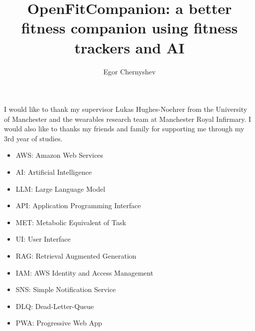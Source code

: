 \documentclass[12pt,BSc,wordcount]{muthesis}
\begin{document}

\title{OpenFitCompanion: a better fitness companion using fitness trackers and AI}
\author{Egor Chernyshev}

\beforeabstract



\afterabstract

I would like to thank my supervisor Lukas Hughes-Noehrer from the University of Manchester and the 
wearables research team at Manchester Royal Infirmary. I would also like to thanks my friends and family
for supporting me through my 3rd year of studies. 

\afterpreface

\begin{itemize}
  \item AWS: Amazon Web Services
  \item AI: Artificial Intelligence
  \item LLM: Large Language Model
  \item API: Application Programming Interface
  \item MET: Metabolic Equivalent of Task
  \item UI: User Interface
  \item RAG: Retrieval Augmented Generation
  \item IAM: AWS Identity and Access Management
  \item SNS: Simple Notification Service
  \item DLQ: Dead-Letter-Queue
  \item PWA: Progressive Web App
\end{itemize}










\end{document}
